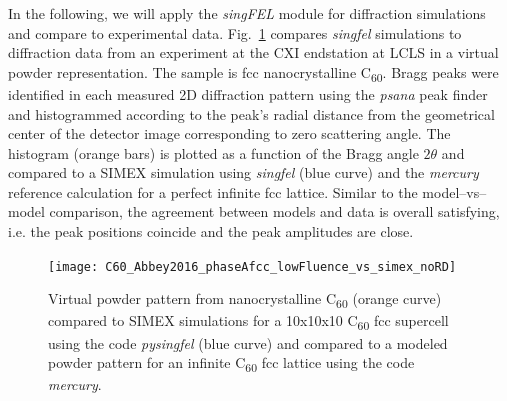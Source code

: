 \documentclass[10pt]{scrartcl}
\begin{document}
In the following, we will
apply the \textit{singFEL} module for diffraction simulations and compare to
experimental data.
Fig.~\ref{fig:C60_virtual_powder_data_vs_models} compares \textit{singfel}
simulations to diffraction data from
an experiment at the CXI endstation at LCLS in a virtual powder representation.
The sample is fcc nanocrystalline C\textsubscript{60}. Bragg peaks were identified in each measured
2D diffraction pattern using the \textit{psana} \cite{psana_www} peak finder
and histogrammed according to the peak's
radial distance from the geometrical center of the detector image corresponding
to zero scattering angle.
The histogram (orange bars) is plotted as a function of the Bragg
angle $2\theta$ and compared to a SIMEX simulation using \textit{singfel}
(blue curve) and the \textit{mercury} reference calculation for a perfect
infinite fcc lattice. Similar to the model--vs--model comparison, the agreement
between models and data is overall satisfying, i.e. the peak positions coincide
and the peak amplitudes are close.
%
\begin{figure}[ht]
  \begin{center}
    \texttt{[image: C60\_Abbey2016\_phaseAfcc\_lowFluence\_vs\_simex\_noRD]}
    \caption{Virtual powder pattern from nanocrystalline C\textsubscript{60}
    \cite{Abbey2016} (orange curve) compared to SIMEX
    simulations for a 10x10x10 C\textsubscript{60} fcc supercell using the code
    \textit{pysingfel} (blue curve) and compared to a modeled powder pattern for
    an infinite C\textsubscript{60} fcc lattice using the code \textit{mercury}.}
    \label{fig:C60_virtual_powder_data_vs_models}
  \end{center}
\end{figure}
%
\end{document}
